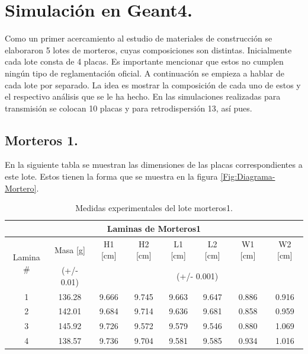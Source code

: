\chapter{Simulación en Geant4.}

Como un primer acercamiento al estudio de materiales de construcción se elaboraron 5 lotes de morteros, cuyas composiciones son distintas. Inicialmente cada lote consta de 4 placas. Es importante mencionar que estos no cumplen ningún tipo de reglamentación oficial. A continuación se empieza a hablar de cada lote por separado. La idea es mostrar la composición de cada uno de estos y el respectivo análisis que se le ha hecho. En las simulaciones realizadas para transmisión se colocan 10 placas y para retrodispersión 13, así pues.

\section{Morteros 1.}

En la siguiente tabla se muestran las dimensiones de las placas correspondientes a este lote. Estos tienen la forma que se muestra en la figura \ref{Fig:Diagrama-Mortero}.


\begin{table}[H]
	\centering
	\begin{tabular}{|c|c|c|c|c|c|c|c|}
		\hline
		\multicolumn{8}{|c|}{Laminas de Morteros1}                                                                             \\ \hline
		\multirow{2}{*}{Lamina \#} & Masa {[}g{]} & H1 {[}cm{]} & H2 {[}cm{]} & L1 {[}cm{]} & L2 {[}cm{]} & W1 {[}cm{]} & W2 {[}cm{]} \\ \cline{2-8} 
		& (+/- 0.01)   & \multicolumn{6}{c|}{(+/- 0.001)}                                                  \\ \hline
		1                          & 136.28       & 9.666      & 9.745      &9.663        & 9.647      & 0.886       & 0.916       \\ \hline
		2                          & 142.01       & 9.684      & 9.714      & 9.636       & 9.681      & 0.858       & 0.959       \\ \hline
		3                          & 145.92       & 9.726      & 9.572      & 9.579       & 9.546      & 0.880       & 1.069       \\ \hline
		4                          & 138.57       & 9.736      & 9.704      & 9.581       & 9.585      & 0.934       & 1.016       \\ \hline
	\end{tabular}
	\caption{Medidas experimentales del lote morteros1.}
	\label{t:medidas-morteros1}
\end{table}



